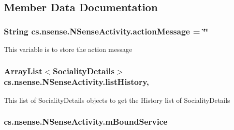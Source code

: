 \subsection{Member Data Documentation}
\hypertarget{classcs_1_1nsense_1_1_n_sense_activity_ad46d4e3f2db1f93c16851a0eb596974b}{
\subsubsection[{action\-Message}]{\setlength{\rightskip}{0pt plus 5cm}String cs.\-nsense.\-N\-Sense\-Activity.\-action\-Message = \char`\"{}\char`\"{}\hspace{0.3cm}{\ttfamily [static]}}}\label{classcs_1_1nsense_1_1_n_sense_activity_ad46d4e3f2db1f93c16851a0eb596974b}
This variable is to store the action message \hypertarget{classcs_1_1nsense_1_1_n_sense_activity_ad32b6b007a685bd0a3aa74ae80f5bec6}{
\subsubsection[{list\-History}]{\setlength{\rightskip}{0pt plus 5cm}Array\-List$<${\bf Sociality\-Details}$>$ cs.\-nsense.\-N\-Sense\-Activity.\-list\-History\hspace{0.3cm}{\ttfamily [static]}, {\ttfamily [private]}}}\label{classcs_1_1nsense_1_1_n_sense_activity_ad32b6b007a685bd0a3aa74ae80f5bec6}
This list of Sociality\-Details objects to get the History list of Sociality\-Details \hypertarget{classcs_1_1nsense_1_1_n_sense_activity_a6a48a71c3cd0c5da40bd62196d5ff07b}{
\subsubsection[{m\-Bound\-Service}]{ cs.\-nsense.\-N\-Sense\-Activity.\-m\-Bound\-Service\hspace{0.3cm}{\ttfamily [private]}}}\label{classcs_1_1nsense_1_1_n_sense_activity_a6a48a71c3cd0c5da40bd62196d5ff07b}
